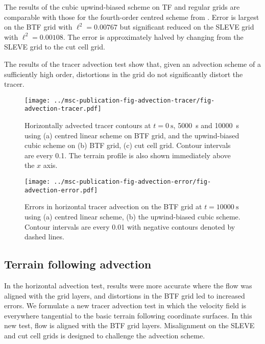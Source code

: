 \documentclass[twocol]{ametsoc}
\begin{document}
The results of the cubic upwind-biased scheme on TF and regular grids are comparable with those for the fourth-order centred scheme from \citet{schaer2002} .  Error is largest on the BTF grid with \(\ell^2 = \num{0.00767}\) but significant reduced on the SLEVE grid with \(\ell^2 = \num{0.00108}\).  The error is approximately halved by changing from the SLEVE grid to the cut cell grid.

The results of the tracer advection test show that, given an advection scheme of a sufficiently high order, distortions in the grid do not significantly distort the tracer.

\begin{figure}
	\centering
	\texttt{[image: ../msc-publication-fig-advection-tracer/fig-advection-tracer.pdf]}
%
	\caption{Horizontally advected tracer contours at \(t = \SI{0}{\second}\), \SI{5000}{\second} and \SI{10000}{\second} using (a) centred linear scheme on BTF grid, and the upwind-biased cubic scheme on (b) BTF grid, (c) cut cell grid.  Contour intervals are every 0.1.  The terrain profile is also shown immediately above the $x$ axis.}
	\label{fig:advection-tracer}
\end{figure}

\begin{figure}
	\centering
	\texttt{[image: ../msc-publication-fig-advection-error/fig-advection-error.pdf]}
	\caption{Errors in horizontal tracer advection on the BTF grid at \(t = \SI{10000}{\second}\) using (a) centred linear scheme, (b) the upwind-biased cubic scheme.  Contour intervals are every 0.01 with negative contours denoted by dashed lines.}
	\label{fig:advection-error}
\end{figure}

\subsection{Terrain following advection}
In the horizontal advection test, results were more accurate where the flow was aligned with the grid layers, and distortions in the BTF grid led to increased errors.  We formulate a new tracer advection test in which the velocity field is everywhere tangential to the basic terrain following coordinate surfaces.  In this new test, flow is aligned with the BTF grid layers.  Misalignment on the SLEVE and cut cell grids is designed to challenge the advection scheme.
\end{document}
